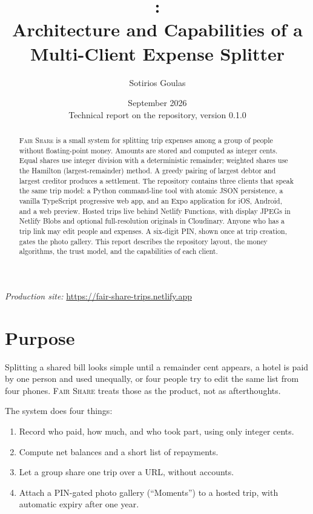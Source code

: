 \documentclass[11pt,a4paper]{article}
\title{\fs:\\Architecture and Capabilities of a Multi-Client Expense Splitter}
\author{Sotirios Goulas}
\date{September 2026\\[0.4em]\small Technical report on the \repo{} repository, version 0.1.0}
\newcommand{\fs}{\textsc{Fair Share}}
\begin{document}
\maketitle

\begin{abstract}
\fs{} is a small system for splitting trip expenses among a group of people without floating-point money.
Amounts are stored and computed as integer cents.
Equal shares use integer division with a deterministic remainder; weighted shares use the Hamilton (largest-remainder) method.
A greedy pairing of largest debtor and largest creditor produces a settlement.
The repository contains three clients that speak the same trip model: a Python command-line tool with atomic JSON persistence, a vanilla TypeScript progressive web app, and an Expo application for iOS, Android, and a web preview.
Hosted trips live behind Netlify Functions, with display JPEGs in Netlify Blobs and optional full-resolution originals in Cloudinary.
Anyone who has a trip link may edit people and expenses.
A six-digit PIN, shown once at trip creation, gates the photo gallery.
This report describes the repository layout, the money algorithms, the trust model, and the capabilities of each client.
\end{abstract}

\tableofcontents
\vspace{1.2em}
\noindent\textit{Production site:} \url{https://fair-share-trips.netlify.app}

\section{Purpose}

Splitting a shared bill looks simple until a remainder cent appears, a hotel is paid by one person and used unequally, or four people try to edit the same list from four phones.
\fs{} treats those as the product, not as afterthoughts.

The system does four things:

\begin{enumerate}[leftmargin=1.6em,itemsep=0.25em]
  \item Record who paid, how much, and who took part, using only integer cents.
  \item Compute net balances and a short list of repayments.
  \item Let a group share one trip over a URL, without accounts.
  \item Attach a PIN-gated photo gallery (``Moments'') to a hosted trip, with automatic expiry after one year.
\end{enumerate}
\end{document}
